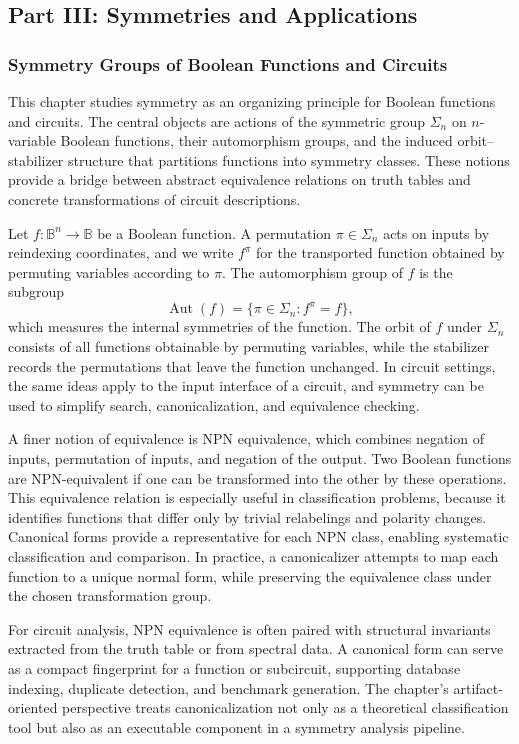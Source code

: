 \documentclass[11pt]{article}
\begin{document}
\subsection{Part III: Symmetries and Applications}

\subsubsection{Symmetry Groups of Boolean Functions and Circuits}

This chapter studies symmetry as an organizing principle for Boolean functions and circuits. The central objects are actions of the symmetric group \(\Sigma_n\) on \(n\)-variable Boolean functions, their automorphism groups, and the induced orbit--stabilizer structure that partitions functions into symmetry classes. These notions provide a bridge between abstract equivalence relations on truth tables and concrete transformations of circuit descriptions.

Let \(f : \mathbb{B}^n \to \mathbb{B}\) be a Boolean function. A permutation \(\pi \in \Sigma_n\) acts on inputs by reindexing coordinates, and we write \(f^\pi\) for the transported function obtained by permuting variables according to \(\pi\). The automorphism group of \(f\) is the subgroup
\[
\operatorname{Aut}(f) = \{\pi \in \Sigma_n : f^\pi = f\},
\]
which measures the internal symmetries of the function. The orbit of \(f\) under \(\Sigma_n\) consists of all functions obtainable by permuting variables, while the stabilizer records the permutations that leave the function unchanged. In circuit settings, the same ideas apply to the input interface of a circuit, and symmetry can be used to simplify search, canonicalization, and equivalence checking.

A finer notion of equivalence is NPN equivalence, which combines negation of inputs, permutation of inputs, and negation of the output. Two Boolean functions are NPN-equivalent if one can be transformed into the other by these operations. This equivalence relation is especially useful in classification problems, because it identifies functions that differ only by trivial relabelings and polarity changes. Canonical forms provide a representative for each NPN class, enabling systematic classification and comparison. In practice, a canonicalizer attempts to map each function to a unique normal form, while preserving the equivalence class under the chosen transformation group.

For circuit analysis, NPN equivalence is often paired with structural invariants extracted from the truth table or from spectral data. A canonical form can serve as a compact fingerprint for a function or subcircuit, supporting database indexing, duplicate detection, and benchmark generation. The chapter's artifact-oriented perspective treats canonicalization not only as a theoretical classification tool but also as an executable component in a symmetry analysis pipeline.
\end{document}
